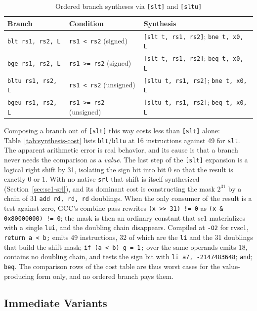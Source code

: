 \begin{table}[htb]
\centering
\caption{Ordered branch syntheses via \texttt{[slt]} and \texttt{[sltu]}}
\label{tab:ordered-branches}
\begin{tabular}{lll}
\toprule
\textbf{Branch} & \textbf{Condition} & \textbf{Synthesis} \\
\midrule
\texttt{blt rs1, rs2, L}  & \texttt{rs1 < rs2} (signed)    & \texttt{[slt t, rs1, rs2]}; \texttt{bne t, x0, L} \\
\texttt{bge rs1, rs2, L}  & \texttt{rs1 >= rs2} (signed)   & \texttt{[slt t, rs1, rs2]}; \texttt{beq t, x0, L} \\
\texttt{bltu rs1, rs2, L} & \texttt{rs1 < rs2} (unsigned)  & \texttt{[sltu t, rs1, rs2]}; \texttt{bne t, x0, L} \\
\texttt{bgeu rs1, rs2, L} & \texttt{rs1 >= rs2} (unsigned) & \texttt{[sltu t, rs1, rs2]}; \texttt{beq t, x0, L} \\
\bottomrule
\end{tabular}
\end{table}

Composing a branch out of \texttt{[slt]} this way costs less than \texttt{[slt]} alone:
Table~\ref{tab:synthesis-cost} lists \texttt{blt}/\texttt{bltu} at 16 instructions against 49 for
\texttt{slt}. The apparent arithmetic error is real behavior, and its cause is that a branch never
needs the comparison as a \textit{value}. The last step of the \texttt{[slt]} expansion is a logical
right shift by 31, isolating the sign bit into bit 0 so that the result is exactly 0 or 1. With no
native \texttt{srl} that shift is itself synthesized (Section~\ref{sec:sc1-srl}), and its dominant
cost is constructing the mask $2^{31}$ by a chain of 31 \texttt{add rd, rd, rd} doublings. When the
only consumer of the result is a test against zero, GCC's combine pass rewrites
\texttt{(x >> 31) != 0} as \texttt{(x \& 0x80000000) != 0}; the mask is then an ordinary constant that
sc1 materializes with a single \texttt{lui}, and the doubling chain disappears. Compiled at
\texttt{-O2} for rvsc1, \texttt{return a < b;} emits 49 instructions, 32 of which are the \texttt{li}
and the 31 doublings that build the shift mask; \texttt{if (a < b) g = 1;} over the same operands
emits 18, contains no doubling chain, and tests the sign bit with \texttt{li a7, -2147483648};
\texttt{and}; \texttt{beq}. The comparison rows of the cost table are thus worst cases for the
value-producing form only, and no ordered branch pays them.

\subsection{Immediate Variants} \label{sec:sc1-immediates}

